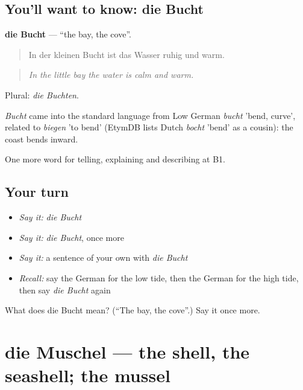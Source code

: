 \subsection*{You'll want to know: die Bucht}
\textbf{die Bucht} — \textquotedblleft{}the bay, the cove\textquotedblright{}.

\begin{quote}
In der kleinen Bucht ist das Wasser ruhig und warm.
\end{quote}

\begin{quote}
\emph{In the little bay the water is calm and warm.}
\end{quote}

Plural: \emph{die Buchten}.

\begin{cousinweb}
\emph{Bucht} came into the standard language from Low German \emph{bucht} 'bend, curve', related to \emph{biegen} 'to bend' (EtymDB lists Dutch \emph{bocht} 'bend' as a cousin): the coast bends inward.
\end{cousinweb}

\begin{grammarlens}[title={What you've built}]
One more word for telling, explaining and describing at B1.
\end{grammarlens}

\subsection*{Your turn}
\begin{itemize}
\raggedright
  \item \emph{Say it:} \emph{die Bucht}
  \item \emph{Say it:} \emph{die Bucht}, once more
  \item \emph{Say it:} a sentence of your own with \emph{die Bucht}
  \item \emph{Recall:} say the German for the low tide, then the German for the high tide, then say \emph{die Bucht} again
\end{itemize}

\begin{tcolorbox}[breakable,colback=teal!4,colframe=teal!35!black,title={Before you move on}]
What does die Bucht mean? (\textquotedblleft{}The bay, the cove\textquotedblright{}.) Say it once more.
\end{tcolorbox}
\section[die Muschel]{die Muschel — the shell, the seashell; the mussel}

